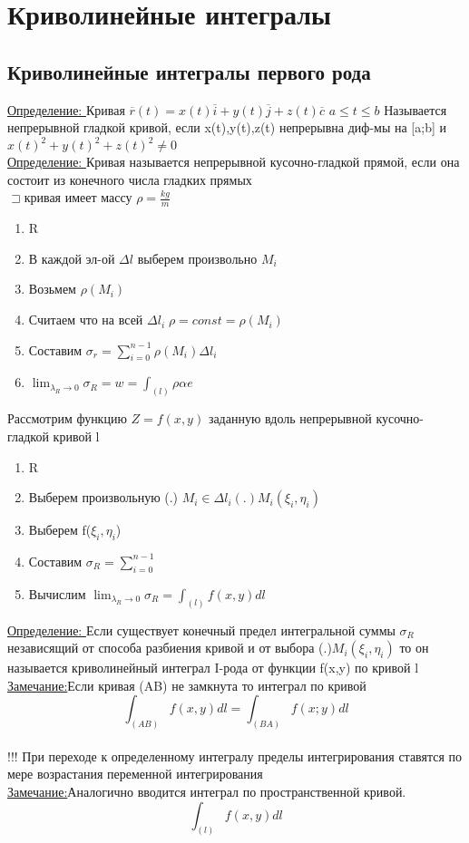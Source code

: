 \documentclass[12pt]{article}
\begin{document}
    \section{Криволинейные интегралы}
    \subsection{Криволинейные интегралы первого рода}
    \underline{Определение: } Кривая $\overline{r}(t)=x(t)\overline{i}+y(t)\overline{j}+z(t)\overline{c}$ \;$a\leq t \leq b$
    Называется непрерывной гладкой кривой, если x(t),y(t),z(t) непрерывна диф-мы на [a;b] и
    $x(t)^2+y(t)^2+z(t)^2\not = 0$\\
    \underline{Определение: } Кривая называется непрерывной кусочно-гладкой прямой, если она состоит из
    конечного числа гладких прямых  \\
    $\sqsupset  $кривая имеет массу $\rho=\frac{kg}{m}$
    \begin{enumerate}
      \item R
      \item В каждой эл-ой $\Delta l$ выберем произвольно $M_i$
      \item Возьмем $\rho(M_i)$
      \item Считаем что на всей $\Delta l_i \; \rho=const=\rho(M_i)$
      \item Составим $\sigma_r=\sum_{i=0}^{n-1} \rho(M_i)\Delta l_i$
      \item $\lim_{\lambda_R \to 0}\sigma_R=w=\int_{(l)}\rho \alpha e$
    \end{enumerate}
    Рассмотрим функцию $Z=f(x,y)$ заданную вдоль непрерывной кусочно-гладкой кривой l\\
    \begin{enumerate}
      \item R
      \item Выберем произвольную (.) $M_i \in \Delta l_i (.)M_i(\xi_i,\eta_i)$
      \item Выберем f($\xi_i,\eta_i$)
      \item Составим $\sigma_R=\sum_{i=0}^{n-1}$
      \item Вычислим $\lim_{\lambda_R \to 0}\sigma_R=\int_{(l)}f(x,y)dl$
    \end{enumerate}
    \underline{Определение: }Если существует конечный предел интегральной суммы $\sigma_R$ независящий от способа разбиения
    кривой и от выбора (.)$M_i(\xi_i,\eta_i)$ то он называется криволинейный интеграл I-рода
    от функции f(x,y) по кривой l \\
    \underline{Замечание:}Если кривая (AB) не замкнута то интеграл по кривой \[\int_{(AB)}f(x,y)dl=
    \int_{(BA)}f(x;y)dl\]\\
    !!! При переходе к определенному интегралу пределы интегрирования ставятся по мере возрастания переменной
    интегрирования\\
    \underline{Замечание:}Аналогично вводится интеграл по пространственной кривой.\\
    \[\int_{(l)}f(x,y)dl\]
\end{document}
